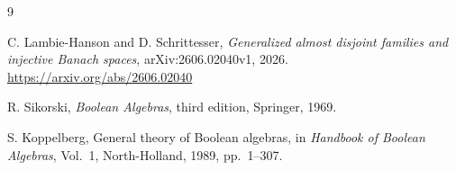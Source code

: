 \documentclass[11pt]{article}
\theoremstyle{definition}
\theoremstyle{remark}
\begin{document}
\begin{thebibliography}{9}

C. Lambie-Hanson and D. Schrittesser,
\emph{Generalized almost disjoint families and injective Banach spaces},
arXiv:2606.02040v1, 2026.
\url{https://arxiv.org/abs/2606.02040}

R. Sikorski,
\emph{Boolean Algebras}, third edition,
Springer, 1969.

S. Koppelberg,
General theory of Boolean algebras,
in \emph{Handbook of Boolean Algebras}, Vol.~1,
North-Holland, 1989, pp.~1--307.

\end{thebibliography}
\end{document}
